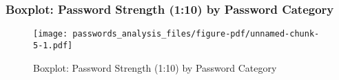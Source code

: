 \documentclass[
  letterpaper,
  DIV=11,
  numbers=noendperiod]{scrartcl}
\begin{document}
\subsubsection{Boxplot: Password Strength (1:10) by Password
Category}\label{boxplot-password-strength-110-by-password-category}

\begin{figure}[H]

{\centering \texttt{[image: passwords\_analysis\_files/figure-pdf/unnamed-chunk-5-1.pdf]}

}

\caption{Boxplot: Password Strength (1:10) by Password Category}

\end{figure}%
\end{document}

